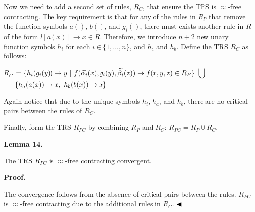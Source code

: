  
 
Now we need to add a second set of rules, $R_{C}$, that ensure the TRS is $\approx$-free contracting. The key requirement is that for any of the rules in $R_{P}$ that remove the function symbols $a()$, $b()$, and $g_{i}()$, there must exists another rule in $R$ of the form $l[a(x)]\rightarrow x\in R$. Therefore, we introduce $n+2$ new unary function symbols $h_{i}$ for each $i\in\{1,\ldots,n\}$, and $h_{a}$ and $h_{b}$. Define the TRS $R_{C}$ as follows:\par
    $\displaystyle R_{C}$ $\displaystyle=\{h_{i}(g_{i}(y))\rightarrow y\leavevmode\nobreak\ |\leavevmode%
\nobreak\ f(\widetilde{\alpha_{i}}(x),g_{i}(y),\widetilde{\beta_{i}}(z))%
\rightarrow f(x,y,z)\in R_{P}\}\leavevmode\nobreak\ \bigcup$      $\displaystyle\hphantom{==}\{h_{a}(a(x))\rightarrow x,\leavevmode\nobreak\ h_{b%
}(b(x))\rightarrow x\}$    
 
 
Again notice that due to the unique symbols $h_{i}$, $h_{a}$, and $h_{b}$, there are no critical pairs between the rules of $R_{C}$.\par
 
 
 
Finally, form the TRS $R_{PC}$ by combining $R_{P}$ and $R_{C}$: $R_{PC}=R_{P}\cup R_{C}$.\par
 
 
 
\par\medskip\noindent\textbf{Lemma 14.}\par
 
 
The TRS $R_{PC}$ is $\approx$-free contracting convergent.\par
 
 
 
 
\par\medskip\noindent\textbf{Proof.}\par
 
 
The convergence follows from the absence of critical pairs between the rules. $R_{PC}$ is $\approx$-free contracting due to the additional rules in $R_{C}$. $\hfill\blacktriangleleft$\par
 
